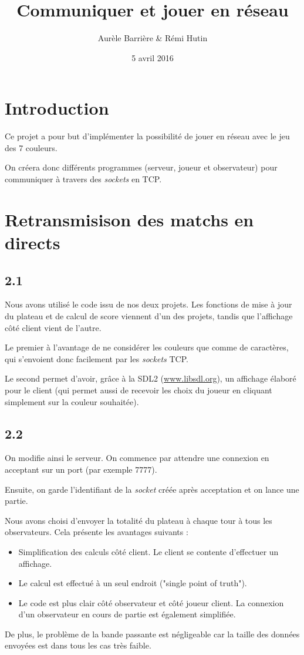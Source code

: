 \documentclass[12pt]{article}
\title{Communiquer et jouer en réseau}
\author{Aurèle Barrière \& Rémi Hutin}
\date{5 avril 2016}
\def\question#1{\subsection{#1}}
\def\sec#1{\section{#1}}
\begin{document}
\maketitle
\tableofcontents

\sec{Introduction}

Ce projet a pour but d'implémenter la possibilité de jouer en réseau avec le jeu des 7 couleurs.

On créera donc différents programmes (serveur, joueur et observateur) pour communiquer à travers des \textit{sockets} en TCP.


\sec{Retransmisison des matchs en directs}
\question{2.1}
Nous avons utilisé le code issu de nos deux projets. Les fonctions de mise à jour du plateau et de calcul de score viennent d'un des projets, tandis que l'affichage côté client vient de l'autre.

Le premier à l'avantage de ne considérer les couleurs que comme de caractères, qui s'envoient donc facilement par les \textit{sockets} TCP.

Le second permet d'avoir, grâce à la SDL2 (\url{www.libsdl.org}), un affichage élaboré pour le client (qui permet aussi de recevoir les choix du joueur en cliquant simplement sur la couleur souhaitée).




\question{2.2}
On modifie ainsi le serveur. On commence par attendre une connexion en acceptant sur un port (par exemple 7777).

Ensuite, on garde l'identifiant de la \textit{socket} créée après acceptation et on lance une partie.

Nous avons choisi d'envoyer la totalité du plateau à chaque tour à tous les observateurs. Cela présente les avantages suivants :
\begin{itemize}
\item Simplification des calculs côté client. Le client se contente d'effectuer un affichage.
\item Le calcul est effectué à un seul endroit ("single point of truth").
\item Le code est plus clair côté observateur et côté joueur client. La connexion d'un observateur en cours de partie est également simplifiée.
\end{itemize}
De plus, le problème de la bande passante est négligeable car la taille des données envoyées est dans tous les cas très faible. \\
\end{document}
